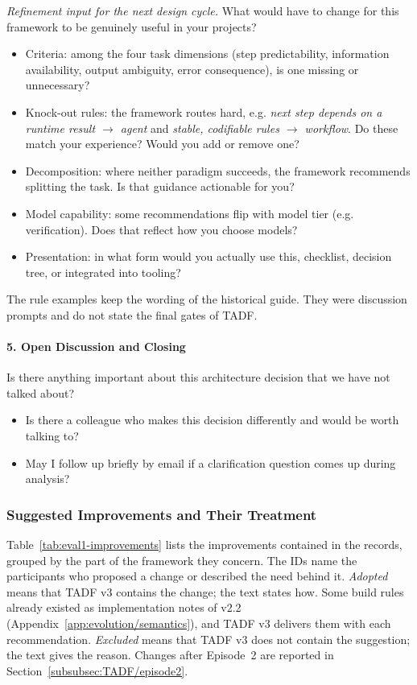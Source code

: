\textit{Refinement input for the next design cycle.} What would have to change for this framework to be genuinely useful in your projects?
\begin{itemize}
    \item Criteria: among the four task dimensions (step predictability, information availability, output ambiguity, error consequence), is one missing or unnecessary?
    \item Knock-out rules: the framework routes hard, e.g. \textit{next step depends on a runtime result $\rightarrow$ agent} and \textit{stable, codifiable rules $\rightarrow$ workflow}. Do these match your experience? Would you add or remove one?
    \item Decomposition: where neither paradigm succeeds, the framework recommends splitting the task. Is that guidance actionable for you?
    \item Model capability: some recommendations flip with model tier (e.g. verification). Does that reflect how you choose models?
    \item Presentation: in what form would you actually use this, checklist, decision tree, or integrated into tooling?
\end{itemize}
The rule examples keep the wording of the historical guide. They were discussion prompts and do not state the final gates of TADF.

\paragraph*{5. Open Discussion and Closing}
Is there anything important about this architecture decision that we have not talked about?
\begin{itemize}
    \item Is there a colleague who makes this decision differently and would be worth talking to?
    \item May I follow up briefly by email if a clarification question comes up during analysis?
\end{itemize}

\subsubsection{Suggested Improvements and Their Treatment}
\label{app:eval1/improvements}

Table~\ref{tab:eval1-improvements} lists the improvements contained in the records, grouped by the part of the framework they concern. The IDs name the participants who proposed a change or described the need behind it. \emph{Adopted} means that TADF v3 contains the change; the text states how. Some build rules already existed as implementation notes of v2.2 (Appendix~\ref{app:evolution/semantics}), and TADF v3 delivers them with each recommendation. \emph{Excluded} means that TADF v3 does not contain the suggestion; the text gives the reason. Changes after Episode~2 are reported in Section~\ref{subsubsec:TADF/episode2}.

